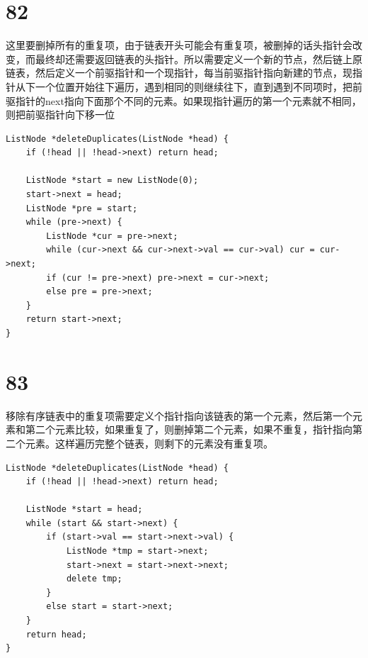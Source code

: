 \documentclass[12pt,a4paper]{article}
\begin{document}
\section{82}
\begin{CJK}{UTF8}{gbsn}
这里要删掉所有的重复项，由于链表开头可能会有重复项，被删掉的话头指针会改变，而最终却还需要返回链表的头指针。所以需要定义一个新的节点，然后链上原链表，然后定义一个前驱指针和一个现指针，每当前驱指针指向新建的节点，现指针从下一个位置开始往下遍历，遇到相同的则继续往下，直到遇到不同项时，把前驱指针的next指向下面那个不同的元素。如果现指针遍历的第一个元素就不相同，则把前驱指针向下移一位
\end{CJK}
\begin{lstlisting}
ListNode *deleteDuplicates(ListNode *head) {
	if (!head || !head->next) return head;

	ListNode *start = new ListNode(0);
	start->next = head;
	ListNode *pre = start;
	while (pre->next) {
		ListNode *cur = pre->next;
		while (cur->next && cur->next->val == cur->val) cur = cur->next;
		if (cur != pre->next) pre->next = cur->next;
		else pre = pre->next;
	}
	return start->next;
}
\end{lstlisting}

\section{83}
\begin{CJK}{UTF8}{gbsn}
移除有序链表中的重复项需要定义个指针指向该链表的第一个元素，然后第一个元素和第二个元素比较，如果重复了，则删掉第二个元素，如果不重复，指针指向第二个元素。这样遍历完整个链表，则剩下的元素没有重复项。
\end{CJK}
\begin{lstlisting}
ListNode *deleteDuplicates(ListNode *head) {
	if (!head || !head->next) return head;

	ListNode *start = head;
	while (start && start->next) {
		if (start->val == start->next->val) {
			ListNode *tmp = start->next;
			start->next = start->next->next;
			delete tmp;
		}
		else start = start->next;
	}
	return head;
}
\end{lstlisting}
\end{document}
